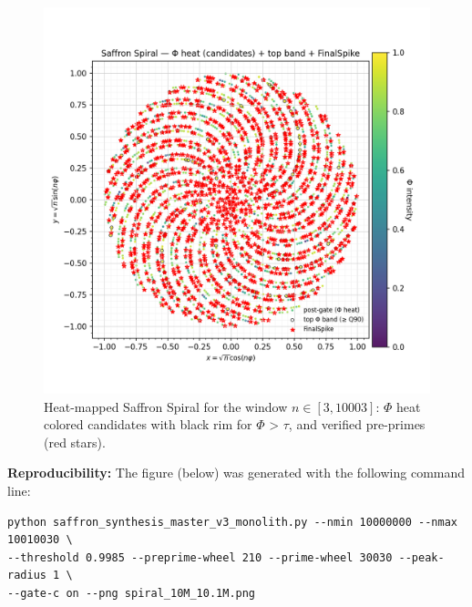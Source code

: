 \documentclass[11pt]{article}
\theoremstyle{plain}
\theoremstyle{definition}
\begin{document}
\begin{figure}[h!]
  \includegraphics[width=0.9\linewidth]{saffron_spiral_3_10003.png}
  \caption{Heat-mapped Saffron Spiral for the window $n \in [3,10003]$:  
           $\Phi$ heat colored candidates with black rim for $\Phi$ > $\tau$, and verified pre-primes (red stars).}
  \label{fig:saffron-spiral-heatmap}
\end{figure}
\FloatBarrier

\noindent\textbf{Reproducibility:} The figure (below) was generated with the following command line:

\begin{verbatim}
python saffron_synthesis_master_v3_monolith.py --nmin 10000000 --nmax 10010030 \
--threshold 0.9985 --preprime-wheel 210 --prime-wheel 30030 --peak-radius 1 \
--gate-c on --png spiral_10M_10.1M.png
\end{verbatim}
\end{document}
